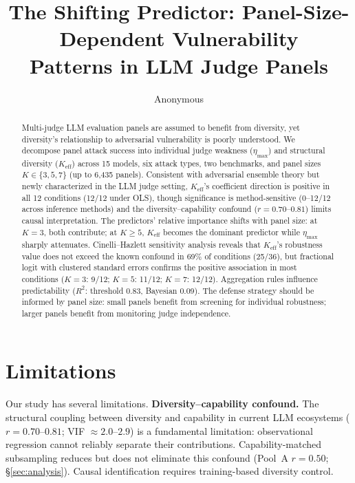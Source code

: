 \documentclass[11pt]{article}
\title{The Shifting Predictor: Panel-Size-Dependent Vulnerability\\Patterns in LLM Judge Panels}
\author{Anonymous}
\begin{document}
\maketitle

\begin{abstract}
Multi-judge LLM evaluation panels are assumed to benefit from diversity, yet diversity's relationship to adversarial vulnerability is poorly understood. We decompose panel attack success into individual judge weakness ($\eta_{\max}$) and structural diversity ($K_{\mathrm{eff}}$) across 15 models, six attack types, two benchmarks, and panel sizes $K \in \{3, 5, 7\}$ (up to 6,435 panels). Consistent with adversarial ensemble theory but newly characterized in the LLM judge setting, $K_{\mathrm{eff}}$'s coefficient direction is positive in all 12 conditions (12/12 under OLS), though significance is method-sensitive (0--12/12 across inference methods) and the diversity--capability confound ($r{=}0.70$--$0.81$) limits causal interpretation. The predictors' relative importance shifts with panel size: at $K{=}3$, both contribute; at $K{\geq}5$, $K_{\mathrm{eff}}$ becomes the dominant predictor while $\eta_{\max}$ sharply attenuates. Cinelli--Hazlett sensitivity analysis reveals that $K_{\mathrm{eff}}$'s robustness value does not exceed the known confound in 69\% of conditions (25/36), but fractional logit with clustered standard errors confirms the positive association in most conditions ($K{=}3$: 9/12; $K{=}5$: 11/12; $K{=}7$: 12/12). Aggregation rules influence predictability ($R^2$: threshold 0.83, Bayesian 0.09). The defense strategy should be informed by panel size: small panels benefit from screening for individual robustness; larger panels benefit from monitoring judge independence.
\end{abstract}









\section*{Limitations}

Our study has several limitations. \textbf{Diversity--capability confound.} The structural coupling between diversity and capability in current LLM ecosystems ($r{=}0.70$--$0.81$; VIF $\approx 2.0$--$2.9$) is a fundamental limitation: observational regression cannot reliably separate their contributions. Capability-matched subsampling reduces but does not eliminate this confound (Pool~A $r{=}0.50$; \S\ref{sec:analysis}). Causal identification requires training-based diversity control.
\end{document}
